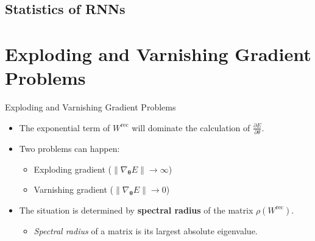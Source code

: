 \documentclass[Nike]{tuberlinbeamer}
\newcommand{\pvec}[1]{\boldsymbol{#1}}
\newcommand{\ppartial}[2]{\frac{\partial #1}{\partial #2}}
\begin{document}
\subsection{Statistics of RNNs}

\section{Exploding and Varnishing Gradient Problems}
\begin{frame}{Exploding and Varnishing Gradient Problems}
	\begin{itemize}
		\item<1->  The exponential term of $W^{\text{rec}}$ will dominate the calculation of $\ppartial{E}{\theta}$. 
		\item<1-> Two problems can happen:
			\begin{itemize}
				\item Exploding gradient ($\|\nabla_{\pvec{\theta}}E\| \rightarrow \infty $)  
				\item Varnishing gradient ($\|\nabla_{\pvec{\theta}}E\| \rightarrow 0 $)  
			\end{itemize}
		\item<1-> The situation is determined by \textbf{spectral radius} of the matrix $\rho(W^{\text{rec}})$.
				\begin{itemize}
					\item \textit{Spectral radius} of a matrix is its largest absolute eigenvalue.
				\end{itemize}
	\end{itemize}
\end{frame}
\end{document}
